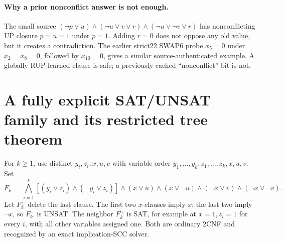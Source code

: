 \documentclass[10pt]{article}
\begin{document}
\paragraph{Why a prior nonconflict answer is not enough.} The small source
$(\neg p\vee u)\land(\neg u\vee v\vee r)\land
(\neg u\vee\neg v\vee r)$ has nonconflicting UP closure $p=u=1$ under $p=1$.
Adding $r=0$ does not oppose any old value, but it creates a contradiction.
The earlier strict22 SWAP6 probe $x_5=0$ under $x_2=x_8=0$, followed by
$x_{10}=0$, gives a similar source-authenticated example. A globally RUP
learned clause is safe; a previously cached ``nonconflict'' bit is not.

\section{A fully explicit SAT/UNSAT family and its restricted tree theorem}
For $k\ge1$, use distinct $y_i,z_i,x,u,v$ with variable order
$y_1,\ldots,y_k,z_1,\ldots,z_k,x,u,v$. Set
\[
 F_k^- = \bigwedge_{i=1}^k[(y_i\vee z_i)\land(\neg y_i\vee z_i)]
 \land(x\vee u)\land(x\vee\neg u)\land
 (\neg x\vee v)\land(\neg x\vee\neg v).
\]
Let $F_k^+$ delete the last clause. The first two $x$-clauses imply $x$;
the last two imply $\neg x$, so $F_k^-$ is UNSAT. The neighbor $F_k^+$ is SAT,
for example at $x=1,z_i=1$ for every $i$, with all other variables assigned
one. Both are ordinary 2CNF and recognized by an exact implication-SCC solver.
\end{document}
